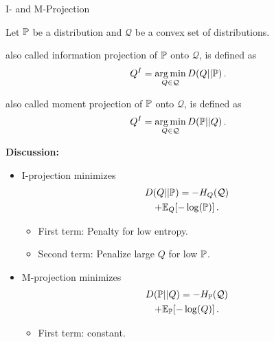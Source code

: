 \begin{frame}{I- and M-Projection}
\begin{definition}
    Let $\Pb$ be a distribution and $\mathcal{Q}$ be a convex set of distributions.
    \begin{description}
        \pause \item[I-Projection,] also called information projection of $\Pb$ onto $\mathcal{Q}$, is defined as
        \begin{equation}
            Q^I = \argmin_{Q \in \mathcal{Q}} D(Q || \Pb)\,.
        \end{equation}
        \pause \item[M-Projection,] also called moment projection of $\Pb$ onto $\mathcal{Q}$, is defined as
        \begin{equation}
            Q^I = \argmin_{Q \in \mathcal{Q}} D(\Pb || Q)\,.
        \end{equation}
    \end{description}
\end{definition}
\pause
\textbf{Discussion:} \\
\begin{minipage}[h]{0.32\textwidth}
\begin{itemize}
    \item I-projection minimizes
    \begin{multline}
        D(Q || \Pb) = -H_Q(\mathcal{Q}) \\ + \E_Q[ -\log(\Pb)] \,.
    \end{multline}
    \begin{itemize}
    \pause \item First term: Penalty for low entropy.
    \pause \item Second term: Penalize large $Q$ for low $\Pb$.
\end{itemize}
\end{itemize}
\end{minipage}
\begin{minipage}[h]{0.32\textwidth}
\begin{itemize}
    \pause \item M-projection minimizes
        \begin{multline}
        D(\Pb || Q) = -H_{\Pb}(\mathcal{Q}) \\ + \E_{\Pb}[ -\log(Q)] \,.
        \end{multline}
    \begin{itemize}
    \pause \item First term: constant.

\end{itemize}
\end{itemize}
\end{minipage}
\end{frame}

